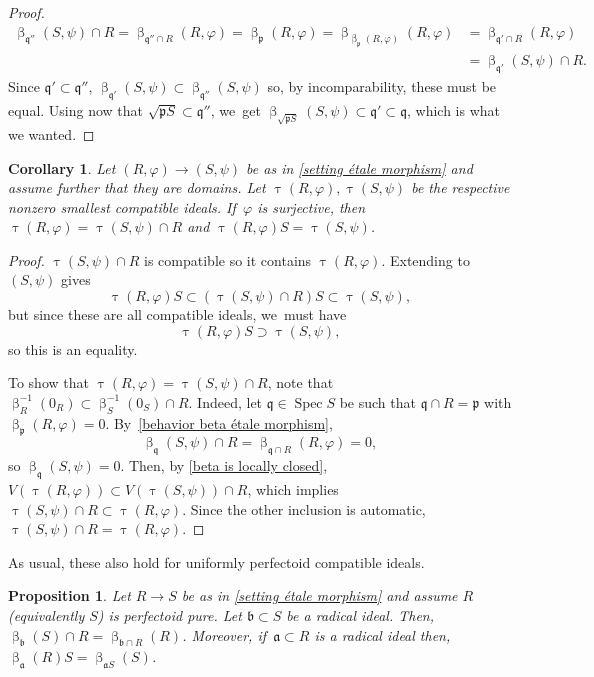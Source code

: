 \documentclass[11pt]{article}
\let\autoref\cref
\theoremstyle{plain}
\newtheorem{corollary}[theorem]{Corollary}
\newtheorem{proposition}[theorem]{Proposition}
\theoremstyle{definition}
\numberwithin{equation}{theorem}
\newcommand{\fra}{\mathfrak{a}}
\newcommand{\frab}{\mathfrak{b}}
\newcommand{\p}{\mathfrak{p}}
\newcommand{\q}{\mathfrak{q}}
\DeclareMathOperator{\Spec}{{Spec}}
\renewcommand{\phi}{\varphi}
\newcommand{\rphi}{(R,\phi)}
\newcommand{\spsi}{(S,\psi)}
\newcommand{\pS}{\p S}
\newcommand{\inv}{^{-1}}
\begin{document}
\begin{proof}
\begin{align*}
\upbeta_{\q''}\spsi\cap R=\upbeta_{\q''\cap R}\rphi=\upbeta_\p\rphi=\upbeta_{\upbeta_\p\rphi}\rphi&=\upbeta_{\q'\cap R}\rphi\\
&=\upbeta_{\q'}\spsi\cap R.
\end{align*}
Since $\q'\subset \q''$, $\upbeta_{\q'}\spsi\subset\upbeta_{\q''}\spsi$ so, by incomparability, these must be equal.
Using now that $\sqrt{\pS}\subset \q''$, we~get $\upbeta_{\sqrt{\pS}}\spsi\subset \q'\subset \q$, which is what we wanted.
\end{proof}

\begin{corollary}\label{test ideal of pairs under étale morphisms}
Let $\rphi\to\spsi$ be as in \autoref{setting étale morphism} and assume further that they are domains. Let $\uptau\rphi, \uptau\spsi$ be the respective nonzero smallest compatible ideals. If~$\phi$ is surjective, then $\uptau\rphi=\uptau\spsi\cap R$ and $\uptau\rphi S=\uptau\spsi$.
\end{corollary}

\begin{proof}
$\uptau\spsi\cap R$ is compatible so it contains $\uptau\rphi$. Extending to $\spsi$ gives
\[
\uptau\rphi S\subset (\uptau\spsi\cap R) S \subset \uptau\spsi,
\]
but since these are all compatible ideals, we~must have
\[
\uptau\rphi S\supset \uptau\spsi,
\]
so this is an equality.

To show that $\uptau\rphi=\uptau\spsi\cap R$, note that $\upbeta_R\inv(0_R)\subset \upbeta_S\inv(0_S)\cap R$. Indeed, let $\q\in \Spec S$ be such that $\q\cap R= \p $ with $\upbeta_\p\rphi=0$. By~\autoref{behavior beta étale morphism},\vspace*{-3pt}
\[
\upbeta_\q\spsi\cap R=\upbeta_{\q\cap R}\rphi=0,
\]
so $\upbeta_\q\spsi=0$.
Then, by \autoref{beta is locally closed}, $V(\uptau\rphi)\subset V(\uptau\spsi)\cap R$, which implies $\uptau\spsi\cap R \subset \uptau\rphi$. Since the other inclusion is automatic, $\uptau\spsi\cap R = \uptau\rphi$.
\end{proof}

As usual, these also hold for uniformly perfectoid compatible ideals.
\begin{proposition}
Let $R\to S$ be as in \autoref{setting étale morphism} and assume $R$ (equivalently $S$) is perfectoid pure. Let $\frab\subset S$ be a radical ideal. Then, $\upbeta_\frab(S)\cap R=\upbeta_{\frab\cap R}(R)$. Moreover, if~$\fra\subset R$ is a radical ideal then, $\upbeta_\fra(R)S=\upbeta_{\fra S}(S)$.
\end{proposition}
\end{document}

